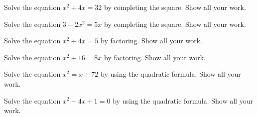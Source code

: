 \documentclass[11pt,letterpaper]{article}
\begin{document}

 Solve the equation $x^2 + 4x= 32$ by completing the square. Show all your work.


\newpage


 Solve the equation $3 - 2x^2= 5x$ by completing the square. Show all your work.


\newpage


 Solve the equation $x^2 + 4x= 5$ by factoring. Show all your work.


\newpage



 Solve the equation $x^2 + 16= 8x$ by factoring. Show all your work.


\newpage



 Solve the equation $x^2= x + 72$ by using the quadratic formula. Show all your work.


\newpage



 Solve the equation $x^2 - 4x + 1= 0$ by using the quadratic formula. Show all your work.










\end{document}
